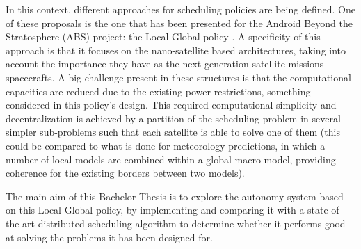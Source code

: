 In this context, different approaches for scheduling policies are being defined. One of these proposals is the one that has been presented for the Android Beyond the Stratosphere (ABS) project: the Local-Global policy \cite{Araguz15}. A specificity of this approach is that it focuses on the nano-satellite based architectures, taking into account the importance they have as the next-generation satellite missions spacecrafts. A big challenge present in these structures is that the computational capacities are reduced due to the existing power restrictions, something considered in this policy's design. This required computational simplicity and decentralization is achieved by a partition of the scheduling problem in several simpler sub-problems such that each satellite is able to solve one of them (this could be compared to what is done for meteorology predictions, in which a number of local models are combined within a global macro-model, providing coherence for the existing borders between two models).

The main aim of this Bachelor Thesis is to explore the autonomy system based on this Local-Global policy, by implementing and comparing it with a state-of-the-art distributed scheduling algorithm to determine whether it performs good at solving the problems it has been designed for.


